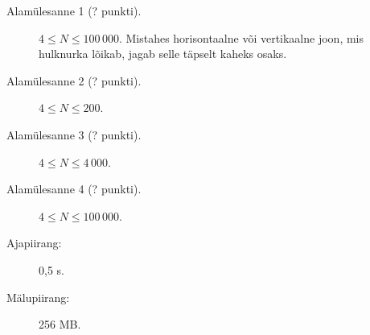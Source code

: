 \documentclass{boi2014-et}
\begin{document}
    \Scoring

    \begin{description}
        \item[Alamülesanne 1 (? punkti).] $4 \le N \le 100\,000$.
            Mistahes horisontaalne või vertikaalne joon, mis hulknurka lõikab,
            jagab selle täpselt kaheks osaks.
        \item[Alamülesanne 2 (? punkti).] $4 \le N \le 200$.
        \item[Alamülesanne 3 (? punkti).] $4 \le N \le 4\,000$.
        \item[Alamülesanne 4 (? punkti).] $4 \le N \le 100\,000$.
    \end{description}

    \Constraints

    \begin{description}
        \item[Ajapiirang:] 0,5 s.
        \item[Mälupiirang:] 256 MB.
    \end{description}
\end{document}
